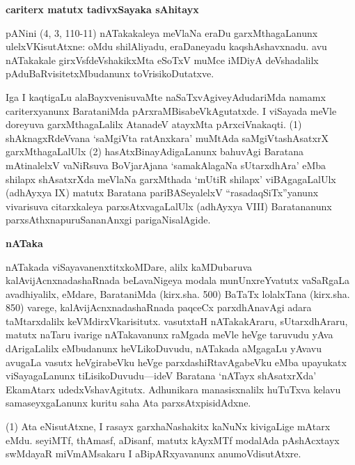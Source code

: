 \newpage

\begin{center}
{\Large\bf cariterx matutx tadivxSayaka sAhitayx}
\end{center}

pANini (4, 3, 110-11) nATakakaleya meVlaNa eraDu garxMthagaLanunx ulelxVKisutAtxne: oMdu shilAliyadu, eraDaneyadu kaqshAshavxnadu. avu nATakakale girxVsfdeVshakikxMta eSoTxV muMce iMDiyA deVshadalilx pAduBaRvisitetxMbudanunx toVrisikoDutatxve.

Iga I kaqtigaLu alaBayxvenisuvaMte naSaTxvAgiveyAdudariMda namamx cariterxyanunx BarataniMda pArxraMBisabeVkAgutatxde. I viSayada meVle doreyuva garxMthagaLalilx AtanadeV atayxMta pArxciVnakaqti. (1) shAknagxRdeVvana `saMgiVta ratAnxkara' muMtAda saMgiVtashAsatxrX garxMthagaLalUlx (2) hasAtxBinayAdigaLanunx bahuvAgi Baratana mAtinalelxV vaNiRsuva BoVjarAjana `samakAlagaNa sUtarxdhAra' eMba shilapx shAsatxrXda meVlaNa garxMthada `mUtiR shilapx' viBAgagaLalUlx (adhAyxya {\rm IX}) matutx Baratana pariBASeyalelxV ``rasadaqSiTx''yanunx vivarisuva citarxkaleya parxsAtxvagaLalUlx (adhAyxya {\rm VIII}) Baratananunx parxsAthxnapuruSananAnxgi parigaNisalAgide.

\bigskip
\begin{center}
{\Large\bf nATaka}
\end{center}

nATakada viSayavanenxtitxkoMDare, alilx kaMDubaruva kalAvijAcnxnadashaRnada beLavaNigeya modala munUnxreYvatutx vaSaRgaLa avadhiyalilx, eMdare, BarataniMda (kirx.sha. 500) BaTaTx lolalxTana (kirx.sha. 850) varege, kalAvijAcnxnadashaRnada paqceCx parxdhAnavAgi adara taMtarxdalilx keVMdirxVkarisitutx. vasutxtaH nATakakAraru, sUtarxdhAraru, matutx naTaru ivarige nATakavanunx raMgada meVle heVge taruvudu yAva dArigaLalilx eMbudanunx heVLikoDuvudu, nATakada aMgagaLu yAvavu avugaLa vasutx heVgirabeVku heVge parxdashiRtavAgabeVku eMba upayukatx viSayagaLanunx tiLisikoDuvudu---ideV Baratana `nATayx shAsatxrXda' EkamAtarx udedxVshavAgitutx. Adhunikara manasisxnalilx huTuTxva kelavu samaseyxgaLanunx kuritu saha Ata parxsAtxpisidAdxne.

(1) Ata eNisutAtxne, I rasayx garxhaNashakitx kaNuNx kivigaLige mAtarx eMdu. seyiMTf, thAmasf, aDisanf, matutx kAyxMTf modalAda pAshAcxtayx swMdayaR miVmAMsakaru I aBipARxyavanunx anumoVdisutAtxre.


